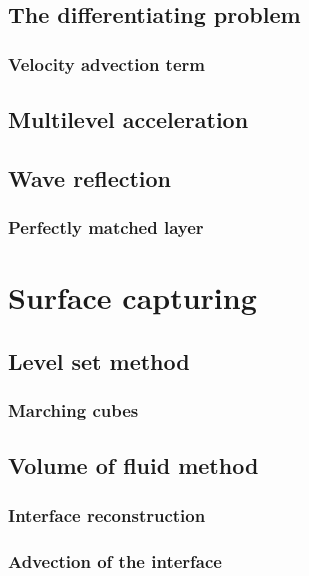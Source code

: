 \documentclass[a4paper]{report}
\begin{document}
\section{The differentiating problem}

\subsection{Velocity advection term}

\section{Multilevel acceleration}

\section{Wave reflection}

\subsection{Perfectly matched layer}

\chapter{Surface capturing}

\section{Level set method}

\subsection{Marching cubes}

\section{Volume of fluid method}

\subsection{Interface reconstruction}

\subsection{Advection of the interface}
\end{document}

